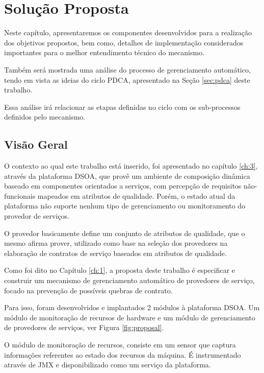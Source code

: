 \chapter{Solução Proposta}
\label{ch:4}

Neste capítulo, apresentaremos os componentes desenvolvidos para a realização dos objetivos propostos, bem como, detalhes de implementação considerados importantes para o melhor entendimento técnico do mecanismo. 

Também será mostrada uma análise do processo de gerenciamento automático, tendo em vista as ideias do ciclo PDCA, apresentado na Seção \ref{sec:pdca} deste trabalho. 

Essa análise irá relacionar as etapas definidas no ciclo com os sub-processos definidos pelo mecanismo.

\section{Visão Geral}
O contexto ao qual este trabalho está inserido, foi apresentado no capítulo \ref{ch:3}, através da plataforma DSOA, que provê um ambiente de composição dinâmica baseado em componentes orientados a serviços, com percepção de requisitos não-funcionais mapeados em atributos de qualidade. Porém, o estado atual da plataforma não suporte nenhum tipo de gerenciamento ou monitoramento do provedor de serviços. 

O provedor basicamente define um conjunto de atributos de qualidade, que o mesmo afirma prover, utilizado como base na seleção dos provedores na elaboração de contratos de serviço baseados em atributos de qualidade.


Como foi dito no Capítulo \ref{ch:1}, a proposta deste trabalho é especificar e construir um mecanismo de gerenciamento automático de provedores de serviço, focado na prevenção de possíveis quebras de contrato.

Para isso, foram desenvolvidos e implantados 2 módulos à plataforma DSOA. Um módulo de monitoração de recursos de hardware e um módulo de gerenciamento de provedores de serviços, ver Figura \ref{fig:proposal}.

O módulo de monitoração de recursos, consiste em um sensor que captura informações referentes ao estado dos recursos da máquina. É instrumentado através de JMX e disponibilizado como um serviço da plataforma. 

